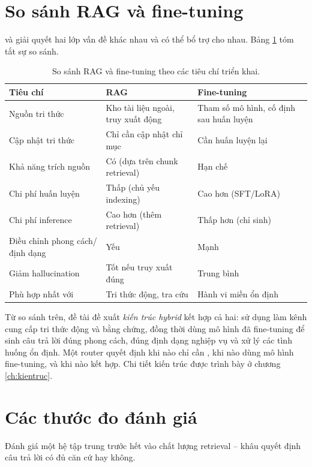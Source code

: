 \section{So sánh RAG và fine-tuning}
\label{sec:hybrid}

\rag{} và \ft{} giải quyết hai lớp vấn đề khác nhau và có thể bổ trợ cho nhau. Bảng
\ref{tab:rag-vs-ft} tóm tắt sự so sánh.

\begin{table}[htbp]
\centering
\caption{So sánh RAG và fine-tuning theo các tiêu chí triển khai.}
\label{tab:rag-vs-ft}
\small
\begin{tabular}{@{}p{3.6cm}p{5.4cm}p{5.4cm}@{}}
\toprule
\textbf{Tiêu chí} & \textbf{RAG} & \textbf{Fine-tuning} \\
\midrule
Nguồn tri thức & Kho tài liệu ngoài, truy xuất động & Tham số mô hình, cố định sau huấn luyện \\
Cập nhật tri thức & Chỉ cần cập nhật chỉ mục & Cần huấn luyện lại \\
Khả năng trích nguồn & Có (dựa trên chunk retrieval) & Hạn chế \\
Chi phí huấn luyện & Thấp (chủ yếu indexing) & Cao hơn (SFT/LoRA) \\
Chi phí inference & Cao hơn (thêm retrieval) & Thấp hơn (chỉ sinh) \\
Điều chỉnh phong cách/định dạng & Yếu & Mạnh \\
Giảm hallucination & Tốt nếu truy xuất đúng & Trung bình \\
Phù hợp nhất với & Tri thức động, tra cứu & Hành vi miền ổn định \\
\bottomrule
\end{tabular}
\end{table}

Từ so sánh trên, đề tài đề xuất \emph{kiến trúc hybrid} kết hợp cả hai: sử dụng \rag{} làm
kênh cung cấp tri thức động và bằng chứng, đồng thời dùng mô hình đã fine-tuning để sinh
câu trả lời đúng phong cách, đúng định dạng nghiệp vụ và xử lý các tình huống ổn định.
Một router quyết định khi nào chỉ cần \rag, khi nào dùng mô hình fine-tuning,
và khi nào kết hợp. Chi tiết kiến trúc được trình bày ở chương \ref{ch:kientruc}.

\section{Các thước đo đánh giá}
\label{sec:metrics}

Đánh giá một hệ \rag{} tập trung trước hết vào chất lượng retrieval -- khâu quyết định
câu trả lời có đủ căn cứ hay không.

